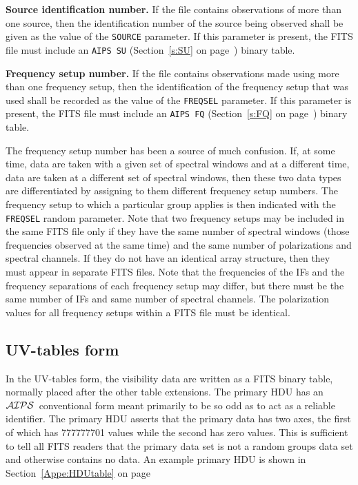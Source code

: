 \documentclass[twoside]{article}
\newcommand{\AIPS}{{$\cal AIPS\/$}}
\begin{document}
{\bf Source identification number.} If the file contains observations
of more than one source, then the identification number of the source
being observed shall be given as the value of the {\tt SOURCE}
parameter.  If this parameter is present, the FITS file must include
an {\tt AIPS SU} (Section~\ref{s:SU} on page~\pageref{s:SU}) binary
table.

{\bf Frequency setup number.} If the file contains observations made
using more than one frequency setup, then the identification of the
frequency setup that was used shall be recorded as the value of the
{\tt FREQSEL} parameter.  If this parameter is present, the FITS file
must include an {\tt AIPS FQ} (Section~\ref{s:FQ} on
page~\pageref{s:FQ}) binary table.

The frequency setup number has been a source of much confusion.  If,
at some time, data are taken with a given set of spectral windows and
at a different time, data are taken at a different set of spectral
windows, then these two data types are differentiated by assigning to
them different frequency setup numbers.  The frequency setup to which
a particular group applies is then indicated with the {\tt FREQSEL}
random parameter.  Note that two frequency setups may be included in
the same FITS file only if they have the same number of spectral
windows (those frequencies observed at the same time) and the same
number of polarizations and spectral channels.  If they do not have an
identical array structure, then they must appear in separate FITS
files.  Note that the frequencies of the IFs and the frequency
separations of each frequency setup may differ, but there must be the
same number of IFs and same number of spectral channels.  The
polarization values for all frequency setups within a FITS file must
be identical.

\subsection{UV-tables form}
\label{TAranpar}

In the UV-tables form, the visibility data are written as a FITS
binary table, normally placed after the other table extensions.  The
primary HDU has an \AIPS\ conventional form meant primarily to be so
odd as to act as a reliable identifier.  The primary HDU asserts that
the primary data has two axes, the first of which has 777777701 values
while the second has zero values.  This is sufficient to tell all FITS
readers that the primary data set is not a random groups data set and
otherwise contains no data.  An example primary HDU is shown in
Section~\ref{Appe:HDUtable} on page~\pageref{Appe:HDUtable}
\end{document}
